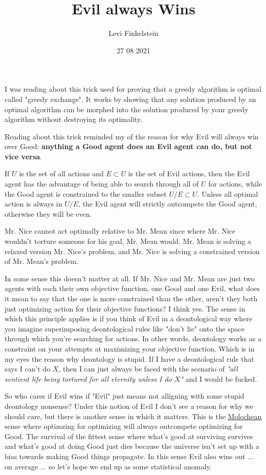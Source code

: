 \usepackage{pgfplots}
\title{Evil always Wins}
\author{Levi Finkelstein}
\date{27 08 2021}

\maketitle

I was reading about this trick used for proving that a greedy algorithm is optimal called "greedy exchange". It works by showing that any solution produced by an optimal algorithm can be morphed into the solution produced by your greedy algorithm without destroying its optimality.
\par
Reading about this trick reminded my of the reason for why Evil will always win over Good: \textbf{anything a Good agent does an Evil agent can do, but not vice versa}.
\par
If $U$ is the set of all actions and $E\subset U$ is the set of Evil actions, then the Evil agent has the advantage of being able to search through all of $U$ for actions, while the Good agent is constrained to the smaller subset $U/E\subset U$. Unless all optimal action is always in $U/E$, the Evil agent will strictly outcompete the Good agent, otherwise they will be even.
\par
Mr. Nice cannot act optimally relative to Mr. Mean since where Mr. Nice wouldn't torture someone for his goal, Mr. Mean would. Mr. Mean is solving a relaxed version Mr. Nice's problem, and Mr. Nice is solving a constrained version of Mr. Mean's problem.
\par
In some sense this doesn't matter at all. If Mr. Nice and Mr. Mean are just two agents with each their own objective function, one Good and one Evil, what does it mean to say that the one is more constrained than the other, aren't they both just optimizing action for their objective functions? I think yes. The sense in which this principle applies is if you think of Evil in a deontological way where you imagine superimposing deontological rules like "don't lie" onto the space through which you're searching for actions. In other words, deontology works as a constraint on your attempts at maximizing your objective function. Which is in my eyes the reason why deontology is stupid. If I have a deontological rule that says I can't do $X$, then I can just always be faced with the scenario of \textit{"all sentient life being tortured for all eternity unless I do $X$"} and I would be fucked.
\par
So who cares if Evil wins if "Evil" just means not alligning with some stupid deontology nonsense? Under this notion of Evil I don't see a reason for why we should care, but there is another sense in which it matters. This is the \href{https://slatestarcodex.com/2014/07/30/meditations-on-moloch/}{Molochean} sense where optimzing for optimizing will always outcompete optimizing for Good. The survival of the fittest sense where what's good at surviving survives and what's good at doing Good just dies because the universe isn't set up with a bias towards making Good things propagate. In this sense Evil also wins out ... on average ... so let's hope we end up as some statistical anomaly.


